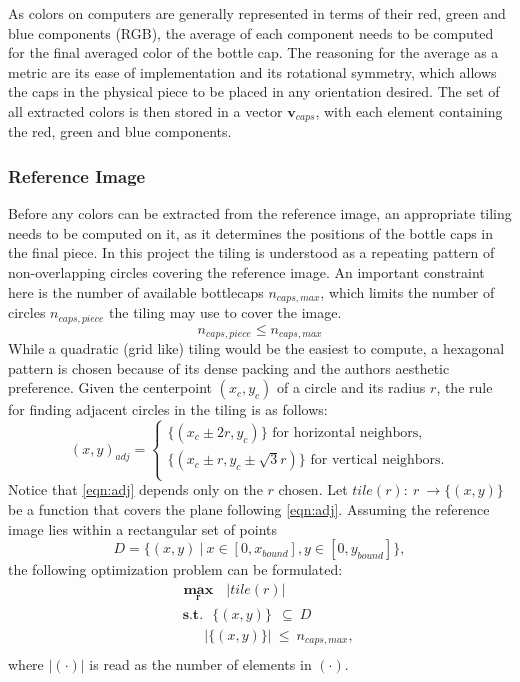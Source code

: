\documentclass{article}
\begin{document}
As colors on computers are generally represented in terms of their red, green and blue components (RGB), the average of each component needs to be computed for the final averaged color of the bottle cap.
The reasoning for the average as a metric are its ease of implementation and its rotational symmetry, which allows the caps in the physical piece to be placed in any orientation desired. 
The set of all extracted colors is then stored in a vector $\boldsymbol{v}_{caps}$, with each element containing the red, green and blue components.

\subsubsection{Reference Image}
Before any colors can be extracted from the reference image, an appropriate tiling needs to be computed on it, as it determines the positions of the bottle caps in the final piece. In this project the tiling is understood as a repeating pattern of non-overlapping circles covering the reference image. 
An important constraint here is the number of available bottlecaps $n_{caps,max}$, which limits the number of circles $n_{caps,piece}$ the tiling may use to cover the image.  
\begin{equation}
\label{eqn:max}
n_{caps,piece} \leq n_{caps,max} 
\end{equation}
While a quadratic (grid like) tiling would be the easiest to compute, a hexagonal pattern is chosen because of its dense packing and the authors aesthetic preference. Given the centerpoint $(x_c,y_c)$ of a circle and its radius $r$, the rule for finding adjacent circles in the tiling is as follows:
\begin{equation}
\label{eqn:adj}
(x,y)_{adj} = 
	\begin{cases}
		\{(x_c \pm 2r,y_c)\} \text{ for horizontal neighbors,} \\
		\{(x_c \pm r, y_c \pm \sqrt{3}r)\} \text{ for vertical neighbors.} \\
	\end{cases}
\end{equation}
Notice that \ref{eqn:adj} depends only on the $r$ chosen. 
Let $tile(r):\ r\ \rightarrow \{(x,y)\}$ be a function that covers the plane following \ref{eqn:adj}.
Assuming the reference image lies within a rectangular set of points 
\begin{equation}
	D = \{(x,y)\ \vert\ x \in [0,x_{bound}], y \in [0,y_{bound}]\},
\end{equation}
the following optimization problem can be formulated:
\begin{equation}
\label{eqn:tile}
\begin{aligned}
& \ \boldsymbol{\max_{r}}\ \ \ \vert tile(r) \vert \\
& \ \ \textbf{s.t.}\ \ \  \{(x,y)\}\ \ \subseteq\ D  \\
& \ \ \ \ \ \ \ \ \ \vert \{(x,y)\} \vert\ \leq\ n_{caps,max}, \\
\end{aligned}
\end{equation}
where $\vert(\cdot)\vert$ is read as the number of elements in $(\cdot)$.
\end{document}

